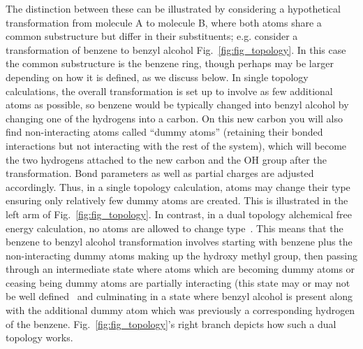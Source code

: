 \documentclass[9pt,bestpractices]{livecoms}
\begin{document}
The distinction between these can be illustrated by considering a hypothetical transformation from molecule A to molecule B, where both atoms share a common substructure but differ in their substituents; e.g. consider a transformation of benzene to benzyl alcohol Fig.~\ref{fig:fig_topology}.
In this case the common substructure is the benzene ring, though perhaps may be larger depending on how it is defined, as we discuss below.
In single topology calculations, the overall transformation is set up to involve as few additional atoms as possible, so benzene would be typically changed into benzyl alcohol by changing one of the hydrogens into a carbon. On this new carbon you will also find non-interacting atoms called ``dummy atoms'' (retaining their bonded interactions but not interacting with the rest of the system), which will become the two hydrogens attached to the new carbon and the OH group after the transformation. Bond parameters as well as partial charges are adjusted accordingly. 
Thus, in a single topology calculation, atoms may change their type ensuring only relatively few dummy atoms are created. This is illustrated in the left arm of Fig.~\ref{fig:fig_topology}. 
In contrast, in a dual topology alchemical free energy calculation, no atoms are allowed to change type~\cite{shirts2012best}. This means that the benzene to benzyl alcohol transformation involves starting with benzene plus the non-interacting dummy atoms making up the hydroxy methyl group, then passing through an intermediate state where atoms which are becoming dummy atoms or ceasing being dummy atoms are partially interacting (this state may or may not be well defined~\cite{mobley2014blind}  and culminating in a state where benzyl alcohol is present along with the additional dummy atom which was previously a corresponding hydrogen of the benzene. Fig.~\ref{fig:fig_topology}'s right branch depicts how such a dual topology works. 
\end{document}

